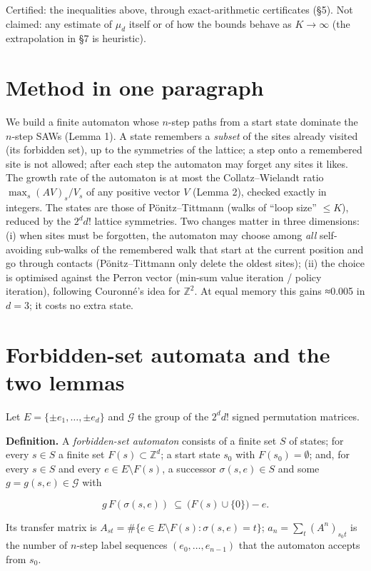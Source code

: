 \documentclass[11pt,a4paper]{report}
\begin{document}
Certified: the inequalities above, through exact-arithmetic certificates (§5). Not claimed: any estimate of
\(\mu_d\) itself or of how the bounds behave as \(K\to\infty\) (the extrapolation in §7 is heuristic).

\section{Method in one paragraph}

We build a finite automaton whose \(n\)-step paths from a start state dominate the \(n\)-step SAWs (Lemma 1). A
state remembers a \emph{subset} of the sites already visited (its forbidden set), up to the symmetries of the lattice;
a step onto a remembered site is not allowed; after each step the automaton may forget any sites it likes. The
growth rate of the automaton is at most the Collatz--Wielandt ratio \(\max_s (AV)_s/V_s\) of any positive vector
\(V\) (Lemma 2), checked exactly in integers. The states are those of Pönitz--Tittmann (walks of ``loop size''
\(\le K\)), reduced by the \(2^dd!\) lattice symmetries. Two changes matter in three dimensions: (i) when sites
must be forgotten, the automaton may choose among \emph{all} self-avoiding sub-walks of the remembered walk that start
at the current position and go through contacts (Pönitz--Tittmann only delete the oldest sites); (ii) the choice is
optimised against the Perron vector (min-sum value iteration / policy iteration), following Couronné's idea for
\(\mathbb Z^2\). At equal memory this gains ≈0.005 in \(d=3\); it costs no extra state.

\section{Forbidden-set automata and the two lemmas}

Let \(E=\{\pm e_1,\dots,\pm e_d\}\) and \(\mathcal G\) the group of the \(2^dd!\) signed permutation matrices.

\textbf{Definition.} A \emph{forbidden-set automaton} consists of a finite set \(S\) of states; for every \(s\in S\) a finite
set \(F(s)\subset\mathbb Z^d\); a start state \(s_0\) with \(F(s_0)=\emptyset\); and, for every \(s\in S\) and every
\(e\in E\setminus F(s)\), a successor \(\sigma(s,e)\in S\) and some \(g=g(s,e)\in\mathcal G\) with

\[g\,F(\sigma(s,e))\ \subseteq\ \bigl(F(s)\cup\{0\}\bigr)-e. \tag{1}\]

Its transfer matrix is \(A_{st}=\#\{e\in E\setminus F(s):\sigma(s,e)=t\}\); \(a_n=\sum_t (A^n)_{s_0t}\) is the number
of \(n\)-step label sequences \((e_0,\dots,e_{n-1})\) that the automaton accepts from \(s_0\).
\end{document}
